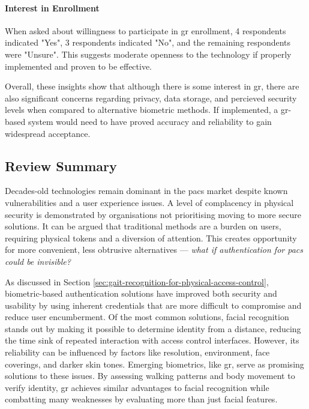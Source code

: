 \paragraph{Interest in Enrollment} When asked about willingness to participate in \ac{gr} enrollment, 4 respondents indicated "Yes", 3 respondents indicated "No", and the remaining respondents were "Unsure". This suggests moderate openness to the technology if properly implemented and proven to be effective.

Overall, these insights show that although there is some interest in \ac{gr}, there are also significant concerns regarding privacy, data storage, and percieved security levels when compared to alternative biometric methods. If implemented, a \ac{gr}-based system would need to have proved accuracy and reliability to gain widespread acceptance.


\subsection{Review Summary}
\label{subsec:review-summary}

Decades-old technologies remain dominant in the \ac{pacs} market despite known vulnerabilities and a user experience issues.
A level of complacency in physical security is demonstrated by organisations not prioritising moving to more secure solutions.
It can be argued that traditional methods are a burden on users, requiring physical tokens and a diversion of attention.
This creates opportunity for more convenient, less obtrusive alternatives --- \textit{what if authentication for \acf{pacs} could be invisible?}

As discussed in Section \ref{sec:gait-recognition-for-physical-access-control}, biometric-based authentication solutions have improved both security and usability by using inherent credentials that are more difficult to compromise and reduce user encumberment.
Of the most common solutions, facial recognition stands out by making it possible to determine identity from a distance, reducing the time sink of repeated interaction with access control interfaces.
However, its reliability can be influenced by factors like resolution, environment, face coverings, and darker skin tones.
Emerging biometrics, like \ac{gr}, serve as promising solutions to these issues. By assessing walking patterns and body movement to verify identity, \ac{gr} achieves similar advantages to facial recognition while combatting many weaknesses by evaluating more than just facial features.

